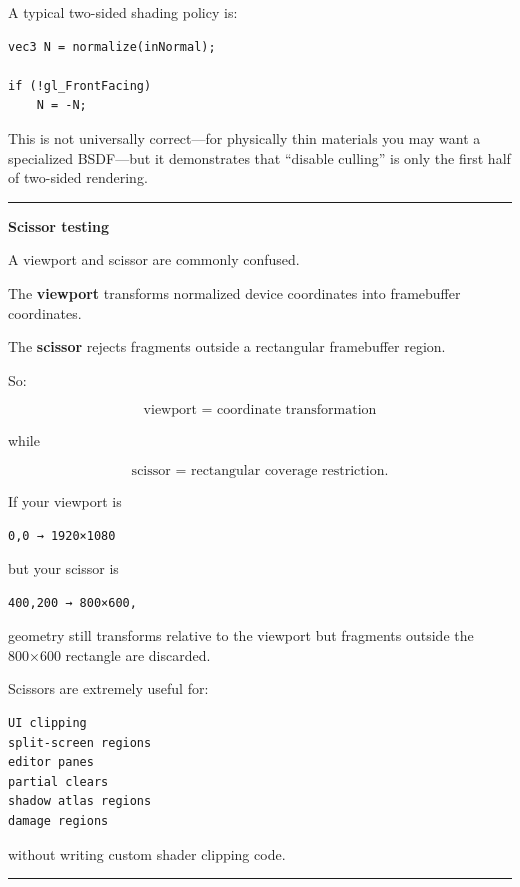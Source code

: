 A typical two-sided shading policy is:

\begin{verbatim}
vec3 N = normalize(inNormal);

if (!gl_FrontFacing)
    N = -N;
\end{verbatim}

This is not universally correct---for physically thin materials you may want a specialized BSDF---but it demonstrates that ``disable culling'' is only the first half of two-sided rendering.

\begin{center}\rule{0.5\linewidth}{0.5pt}\end{center}

\textbf{Scissor testing}

A viewport and scissor are commonly confused.

The \textbf{viewport} transforms normalized device coordinates into framebuffer coordinates.

The \textbf{scissor} rejects fragments outside a rectangular framebuffer region.

So:

\[
\boxed{\text{viewport = coordinate transformation}}
\]

while

\[
\boxed{\text{scissor = rectangular coverage restriction}}.
\]

If your viewport is

\begin{verbatim}
0,0 → 1920×1080
\end{verbatim}

but your scissor is

\begin{verbatim}
400,200 → 800×600,
\end{verbatim}

geometry still transforms relative to the viewport but fragments outside the 800×600 rectangle are discarded.

Scissors are extremely useful for:

\begin{verbatim}
UI clipping
split-screen regions
editor panes
partial clears
shadow atlas regions
damage regions
\end{verbatim}

without writing custom shader clipping code.

\begin{center}\rule{0.5\linewidth}{0.5pt}\end{center}

